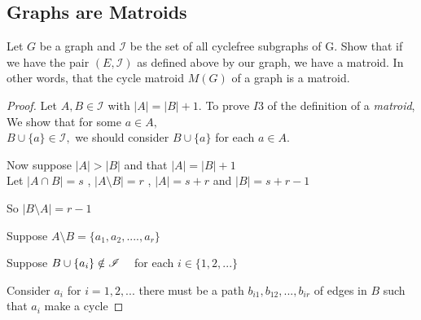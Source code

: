 \documentclass[../main.tex]{subfiles}
\begin{document}
\subsection{Graphs are Matroids} 
\begin{thm}
\noindent Let $G$ be a graph and $\mathcal{I}$ be the set of all cyclefree subgraphs of G.
Show that if we have the pair $(E,\mathcal{I})$ as defined above by our graph, we have a matroid. In other words, that the cycle matroid $M(G)$ of a graph is a matroid.
\end{thm} 
\begin{proof}
 Let $A,B \in \mathcal{I}$ with $|A|=|B|+1.$
 \noindent To prove $ I3 $ of the definition of a \textit{matroid}, We show that for some $a \in A ,$\\$ B \cup \{a\} \in \mathcal{I},$  we should consider $B \cup \{a\}$ for each $a \in A.$ 
 
 \noindent Now suppose $ |A|  >  |B| $ and that $|A|  =  |B| + 1$\\
 Let 
 $ |A \cap B| = s $ , $ |A \setminus B| = r$ ,
 $ |A| = s + r $ and $ |B| = s + r - 1$ 
 
\noindent So $ |B \setminus A| = r - 1$
 
 \noindent Suppose $ A \setminus B = \{ a_1, a_2, .... , a_r \} $ 
 
 \noindent Suppose $ B \cup \{ a_i \} \notin \mathcal{I} \hspace{3mm} $ for each $ i \in \{ 1,2,... \}$
 
 \noindent Consider $ a_i $ for $ i = 1, 2,... $ there must be a path $ b_{i1}, b_{12}, ... , b_{ir} $ of edges in $B$ such that $ a_i $ make a cycle
  
 \begin{minipage}{.2\textwidth}
 \end{minipage}
\hspace{4cm} \begin{minipage}{.2\textwidth}
\end{minipage}
\end{proof}
\end{document}
